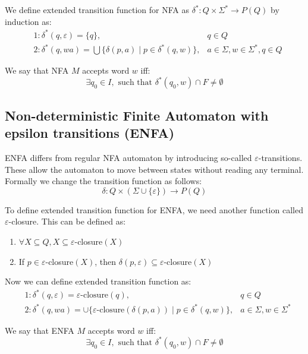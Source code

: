 \documentclass{ctuthesis}
\begin{document}
We define extended transition function for NFA as $\delta^* : Q \times \Sigma^* \rightarrow P(Q)$ by induction as:
\begin{align*}
	&1: \delta^*(q, \varepsilon) = \{q\}, &q \in Q \\
	&2: \delta^*(q, wa) = \bigcup\{\delta(p, a) \mid p \in \delta^*(q, w)\}, &a \in \Sigma, w \in \Sigma^*, q \in Q
\end{align*}

We say that NFA $M$ accepts word $w$ iff:
\begin{equation*}
	\exists q_0 \in I, \text{ such that } \delta^*(q_0, w) \cap F \ne \emptyset
\end{equation*}

\subsection{Non-deterministic Finite Automaton with epsilon transitions (ENFA)}
ENFA differs from regular NFA automaton by introducing so-called $\varepsilon$-transitions. These allow the automaton to move between states without reading any terminal. Formally we change the transition function as follows:
\begin{equation*}
	\delta: Q \times (\Sigma \cup \{\varepsilon\}) \rightarrow P(Q)
\end{equation*}

To define extended transition function for ENFA, we need another function called $\varepsilon$-closure. This can be defined as:
\begin{enumerate}
	\item $\forall X \subseteq Q, X \subseteq \varepsilon$-closure$(X)$
	\item If $p \in \varepsilon$-closure$(X)$, then $\delta(p, \varepsilon) \subseteq \varepsilon$-closure$(X)$
\end{enumerate}

Now we can define extended transition function as:
\begin{align*}
	&1: \delta^*(q, \varepsilon) = \varepsilon\text{-closure}(q), &q \in Q \\
	&2: \delta^*(q, wa) = \cup\{\varepsilon\text{-closure}(\delta(p, a)) \mid p \in \delta^*(q, w)\}, &a \in \Sigma, w \in \Sigma^*
\end{align*}

We say that ENFA $M$ accepts word $w$ iff:
\begin{equation*}
	\exists q_0 \in I, \text{ such that } \delta^*(q_0, w) \cap F \ne \emptyset
\end{equation*}
\end{document}
